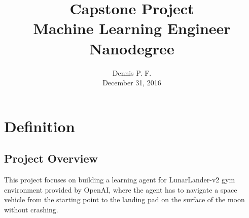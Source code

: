 \documentclass{svproc}
\begin{document}
\mainmatter
\title{Capstone Project \\ {\large Machine Learning Engineer Nanodegree}}
\author{Dennis P. F. \\ {\small December 31, 2016}}
\institute{}
\maketitle
\pagestyle{empty}
\section{Definition}
\subsection*{Project Overview}
This project focuses on building a learning agent for LunarLander-v2 gym environment provided by OpenAI\cite{challenge}, where the agent has to navigate a space vehicle from the starting point to the landing pad on the surface of the moon without crashing.
\end{document}
